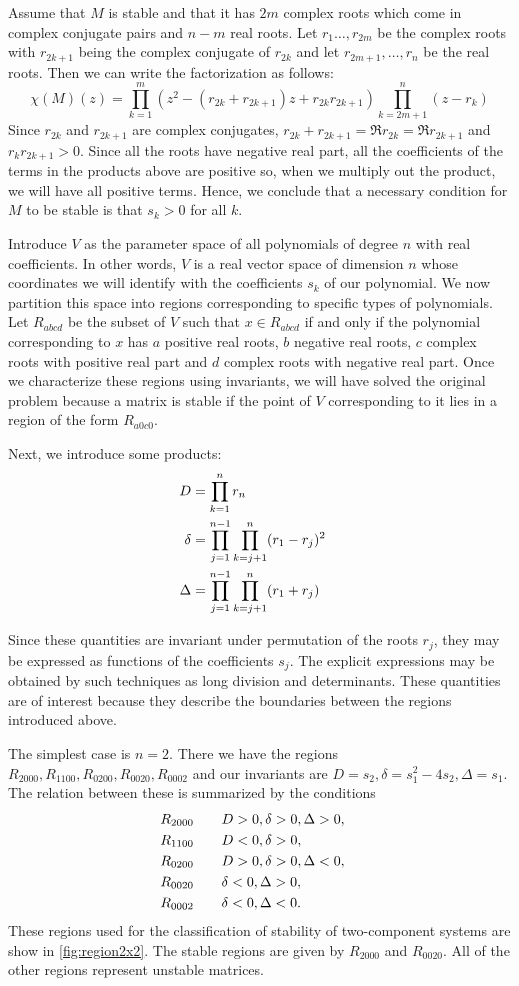 \documentclass{amsart}
\theoremstyle{definition}
\theoremstyle{remark}
\numberwithin{equation}{section}
\begin{document}
Assume that $M$ is stable and that it has $2m$ complex roots which come in complex conjugate pairs and $n-m$ real roots.  Let $r_1 \ldots, r_{2m}$ be the complex roots with $r_{2k+1}$ being the complex conjugate of $r_{2k}$ and let $r_{2m+1}, \ldots,  r_{n}$ be the real roots. Then we can write the factorization as follows:
\[
\chi(M)(z) = \prod_{k=1}^{m} (z^2 - (r_{2k} + r_{2k+1}) z + r_{2k} r_{2k+1})
             \prod_{k=2m+1}^{n} (z - r_k)
\]
Since $r_{2k}$ and $r_{2k+1}$ are complex conjugates, $r_{2k} + r_{2k+1} =
\Re r_{2k} = \Re r_{2k+1}$ and $r_{k} r_{2k+1} > 0$.   Since all the
roots have negative real part, all the coefficients of the terms in
the products above are positive so, when we multiply out the product,
we will have all positive terms.  Hence, we conclude that a necessary
condition for $M$ to be stable is that $s_k > 0$ for all $k$.

Introduce $V$ as the parameter space of all polynomials of degree $n$
with real coefficients.  In other words, $V$ is a real vector space of
dimension $n$ whose coordinates we will identify with the coefficients
$s_k$ of our polynomial.  We now partition this space into regions
corresponding to specific types of polynomials.  Let $R_{abcd}$ be the
subset of $V$ such that $x \in R_{abcd}$ if and only if the polynomial
corresponding to $x$ has $a$ positive real roots, $b$ negative real
roots, $c$ complex roots with positive real part and $d$ complex roots
with negative real part.  Once we characterize these regions using
invariants, we will have solved the original problem because a matrix
is stable if the point of $V$ corresponding to it lies in a region of
the form $R_{a0c0}$.

Next, we introduce some products:
\begin{align}
D &= \prod_{k=1}^n r_n \cr
\delta &= \prod_{j=1}^{n-1} \prod_{k=j+1}^n (r_1 - r_j)^2 \cr
\Delta &= \prod_{j=1}^{n-1} \prod_{k=j+1}^n (r_1 + r_j) \cr
\end{align}

Since these quantities are invariant under permutation of the roots
$r_j$, they may be expressed as functions of the coefficients $s_j$.
The explicit expressions may be obtained by such techniques as long
division and determinants. These quantities are of interest because they describe the boundaries between the regions introduced above.

The simplest case is $n=2$.  There we have the regions $R_{2000},
R_{1100}, R_{0200}, R_{0020}, R_{0002}$ and our invariants are $D =
s_2, \delta = s_1^2 - 4s_2, \Delta = s_1$.  The relation between these
is summarized by the conditions
\begin{align}
R_{2000} \qquad &D > 0, \delta > 0, \Delta > 0, \cr
R_{1100} \qquad &D < 0, \delta > 0, \cr
R_{0200} \qquad &D > 0, \delta > 0, \Delta < 0, \cr
R_{0020} \qquad &\delta < 0, \Delta > 0, \cr
R_{0002} \qquad &\delta < 0, \Delta < 0. \cr
\end{align}
These regions used for the classification of stability of two-component systems are show in \ref{fig:region2x2}. The stable regions are given by $R_{2000}$ and $R_{0020}$. All of the other regions represent unstable matrices.
\end{document}
